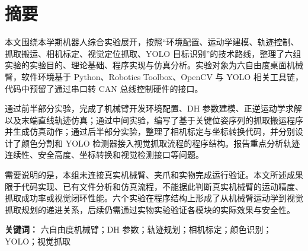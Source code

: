 \section*{摘要}

本文围绕本学期机器人综合实验展开，按照“环境配置、运动学建模、轨迹控制、抓取搬运、相机标定、视觉定位抓取、YOLO 目标识别”的技术路线，整理了六组实验的实验目的、理论基础、程序实现与仿真分析。实验对象为六自由度桌面机械臂，软件环境基于 Python、Robotics Toolbox、OpenCV 与 YOLO 相关工具链，代码中预留了通过串口转 CAN 总线控制硬件的接口。

通过前半部分实验，完成了机械臂开发环境配置、DH 参数建模、正逆运动学求解以及末端直线轨迹仿真；通过中间实验，编写了基于关键位姿序列的抓取搬运程序并生成仿真动作；通过后半部分实验，整理了相机标定与坐标转换代码，并分别设计了颜色分割和 YOLO 检测器接入视觉抓取流程的程序结构。报告重点分析轨迹连续性、安全高度、坐标转换和视觉检测接口等问题。

需要说明的是，本组未连接真实机械臂、夹爪和实物完成运行验证。本文所述成果限于代码实现、已有文件分析和仿真流程，不能据此判断真实机械臂的运动精度、抓取成功率或视觉闭环性能。六个实验在程序结构上形成了从机械臂运动学到视觉抓取规划的递进关系，后续仍需通过实物实验验证各模块的实际效果与安全性。

\textbf{关键词：} 六自由度机械臂；DH 参数；轨迹规划；相机标定；颜色识别；YOLO；视觉抓取

\newpage
